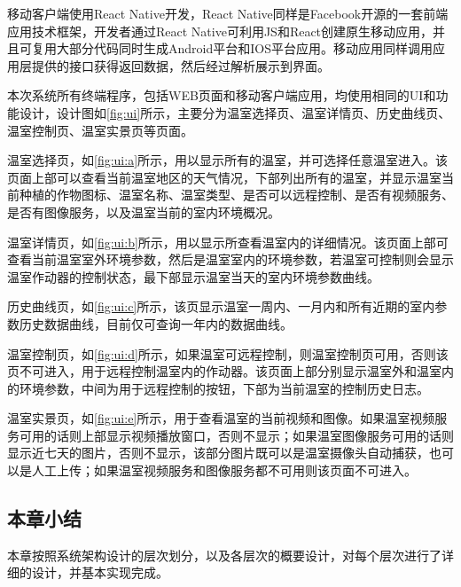移动客户端使用React Native开发，React Native同样是Facebook开源的一套前端应用技术框架，开发者通过React Native可利用JS和React创建原生移动应用，并且可复用大部分代码同时生成Android平台和IOS平台应用。移动应用同样调用应用层提供的接口获得返回数据，然后经过解析展示到界面。
	\begin{figure}[!htp]
		\centering
	\end{figure}
本次系统所有终端程序，包括WEB页面和移动客户端应用，均使用相同的UI和功能设计，设计图如\ref{fig:ui}所示，主要分为温室选择页、温室详情页、历史曲线页、温室控制页、温室实景页等页面。

温室选择页，如\ref{fig:ui:a}所示，用以显示所有的温室，并可选择任意温室进入。该页面上部可以查看当前温室地区的天气情况，下部列出所有的温室，并显示温室当前种植的作物图标、温室名称、温室类型、是否可以远程控制、是否有视频服务、是否有图像服务，以及温室当前的室内环境概况。

温室详情页，如\ref{fig:ui:b}所示，用以显示所查看温室内的详细情况。该页面上部可查看当前温室室外环境参数，然后是温室室内的环境参数，若温室可控制则会显示温室作动器的控制状态，最下部显示温室当天的室内环境参数曲线。

历史曲线页，如\ref{fig:ui:c}所示，该页显示温室一周内、一月内和所有近期的室内参数历史数据曲线，目前仅可查询一年内的数据曲线。

温室控制页，如\ref{fig:ui:d}所示，如果温室可远程控制，则温室控制页可用，否则该页不可进入，用于远程控制温室内的作动器。该页面上部分别显示温室外和温室内的环境参数，中间为用于远程控制的按钮，下部为当前温室的控制历史日志。

温室实景页，如\ref{fig:ui:e}所示，用于查看温室的当前视频和图像。如果温室视频服务可用的话则上部显示视频播放窗口，否则不显示；如果温室图像服务可用的话则显示近七天的图片，否则不显示，该部分图片既可以是温室摄像头自动捕获，也可以是人工上传；如果温室视频服务和图像服务都不可用则该页面不可进入。
	\subsection{本章小结}
本章按照系统架构设计的层次划分，以及各层次的概要设计，对每个层次进行了详细的设计，并基本实现完成。

